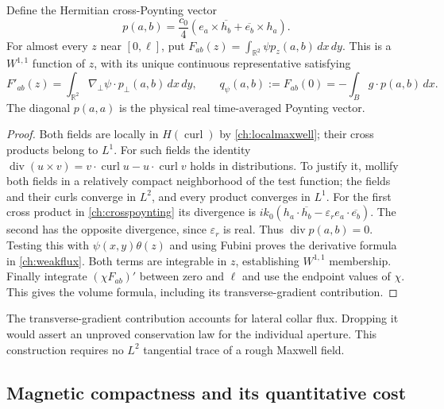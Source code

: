 \begin{lemma}
\label{ch:fluxlemma}
Define the Hermitian cross-Poynting vector
\begin{equation}
 p(a,b)=\frac{c_0}{4}
 \left(e_a\times\overline{h_b}+\overline{e_b}\times h_a\right).
 \label{ch:crosspoynting}
\end{equation}
For almost every $z$ near $[0,\ell]$, put
$F_{ab}(z)=\int_{\mathbb R^2}\psi p_z(a,b)\,dx\,dy$.
This is a $W^{1,1}$ function of $z$, with its unique continuous
representative satisfying
\begin{equation}
 F'_{ab}(z)=\int_{\mathbb R^2}\nabla_\perp\psi\cdot p_\perp(a,b)\,dx\,dy,
 \qquad
 q_\psi(a,b):=F_{ab}(0)=-\int_Bg\cdot p(a,b)\,dx.
 \label{ch:weakflux}
\end{equation}
The diagonal $p(a,a)$ is the physical real time-averaged Poynting vector.
\end{lemma}
\begin{proof}
Both fields are locally in $H(\operatorname{curl})$ by
\eqref{ch:localmaxwell}; their cross products belong to $L^1$.
For such fields the identity
$\operatorname{div}(u\times v)=v\cdot\operatorname{curl}u-
u\cdot\operatorname{curl}v$ holds in distributions.  To justify it, mollify
both fields in a relatively compact neighborhood of the test function;
the fields and their curls converge in $L^2$, and every product converges
in $L^1$.  For the first cross product in \eqref{ch:crosspoynting} its
divergence is
$ik_0(h_a\cdot\overline{h_b}-\varepsilon_r e_a\cdot\overline{e_b})$.
The second has the opposite divergence, since $\varepsilon_r$ is real.
Thus $\operatorname{div}p(a,b)=0$.  Testing this with
$\psi(x,y)\theta(z)$ and using Fubini proves the derivative formula in
\eqref{ch:weakflux}.  Both terms are integrable in $z$, establishing
$W^{1,1}$ membership.  Finally integrate $(\chi F_{ab})'$ between zero
and $\ell$ and use the endpoint values of $\chi$.  This gives the volume
formula, including its transverse-gradient contribution.
\end{proof}

The transverse-gradient contribution accounts for lateral collar flux.
Dropping it would assert an unproved conservation law for the individual
aperture.  This construction requires no $L^2$ tangential trace of a rough
Maxwell field.

\subsection{Magnetic compactness and its quantitative cost}
\label{ch:magnetic}

